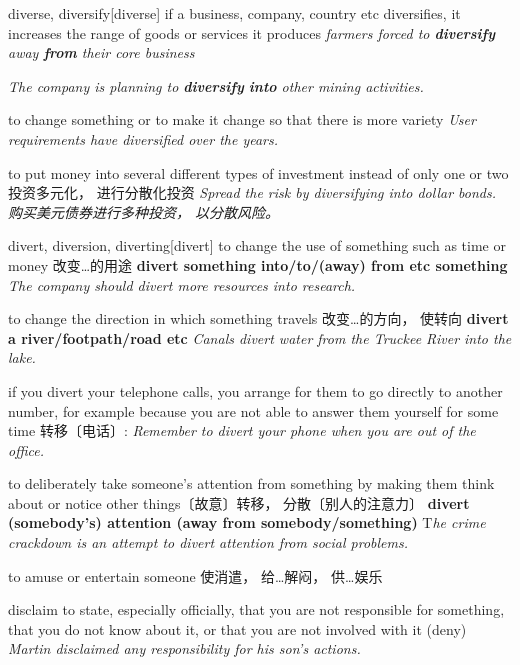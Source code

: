 \begin{DefWord}{diverse, diversify}[diverse]
    if a business, company, country etc diversifies, it increases the range of goods or services it produces
    \textit{farmers forced to \textbf{diversify} away \textbf{from} their core business}

    \textit{The company is planning to \textbf{diversify} \textbf{into} other mining activities.}

    to change something or to make it change so that there is more variety
    \textit{User requirements have diversified over the years.}

    to put money into several different types of investment instead of only one or two 投资多元化， 进行分散化投资
    \textit{Spread the risk by diversifying into dollar bonds. 购买美元债券进行多种投资， 以分散风险。 }

\end{DefWord}

\begin{DefWord}{divert, diversion, diverting}[divert]
    to change the use of something such as time or money 改变…的用途
    \textbf{divert something into/to/(away) from etc something}
    \textit{The company should divert more resources into research.}

    to change the direction in which something travels 改变…的方向， 使转向
    \textbf{divert a river/footpath/road etc}
    \textit{Canals divert water from the Truckee River into the lake.}

    if you divert your telephone calls, you arrange for them to go directly to another number, for example because you are not able to answer them yourself for some time 转移〔电话〕:
    \textit{Remember to divert your phone when you are out of the office.}

    to deliberately take someone's attention from something by making them think about or notice other things〔故意〕转移， 分散〔别人的注意力〕
    \textbf{divert (somebody's) attention (away from somebody/something)}
    T\textit{he crime crackdown is an attempt to divert attention from social problems.}
 
    to amuse or entertain someone 使消遣， 给…解闷， 供…娱乐

\end{DefWord}


\begin{DefWord}{disclaim}
    to state, especially officially, that you are not responsible for something, that you do not know about it, or that you are not involved with it (deny)
    \textit{Martin disclaimed any responsibility for his son's actions.}
\end{DefWord}

